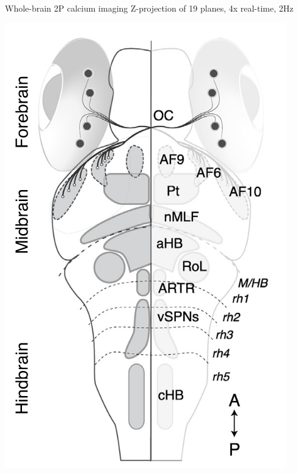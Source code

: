 \begin{frame}{ Whole-brain 2P calcium imaging }{Z-projection of 19 planes, 4x real-time, 2Hz}
		\vspace{-20mm}
		\centering
		\begin{turn}{-90}
				\begin{minipage}{0.7\textheight}
					\includegraphics[height=0.5\textheight]{media/larval_atlas}
			 \end{minipage}
		 \end{turn}


\end{frame}

